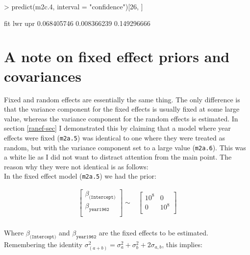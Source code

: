 \documentclass{article}
\begin{document}
\begin{Schunk}
\begin{Sinput}
> predict(m2c.4, interval = "confidence")[26, ]
\end{Sinput}
\begin{Soutput}
        fit         lwr         upr 
0.068405746 0.008366239 0.149296666 
\end{Soutput}
\end{Schunk}


\section{A note on fixed effect priors and covariances}
\label{PriorContr-sec}

Fixed and random effects are essentially the same thing. The only difference is that the variance component for the fixed effects is usually fixed at some large value, whereas the variance component for the random effects is estimated.  In section \ref{ranef-sec} I demonstrated this by claiming that a model where year effects were fixed (\texttt{m2a.5}) was identical to one where they were treated as random, but with the variance component set to a large value (\texttt{m2a.6}). This was a white lie as I did not want to distract attention from the main point. The reason why they were not identical is as follows:\\

In the fixed effect model (\texttt{m2a.5}) we had the prior:  

\begin{equation}
\begin{array}{rcl}
\left[
\begin{array}{c}
 \beta_{\texttt{(Intercept)}}\\
 \beta_{\texttt{year1962}}\\
\end{array}
\right]
\sim
&
\left[
\begin{array}{cc}
10^8&0\\
0&10^8\\
\end{array}
\right]\\
\end{array}
\end{equation}

Where $\beta_{\texttt{(Intercept)}}$ and $\beta_{\texttt{year1962}}$ are the fixed effects to be estimated.\\

Remembering the identity  $\sigma^{2}_{(a+b)} = \sigma^{2}_{a}+ \sigma^{2}_{b}+2\sigma_{a,b}$, this implies:
\end{document}
